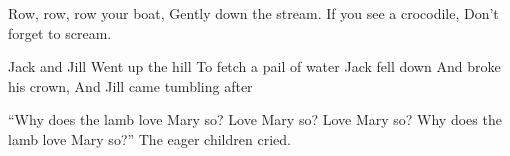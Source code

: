 \documentclass{article}
\begin{document}
\setlength{\columnseprule}{3pt} %
\begin{multicols}{3} %
Row, row, row your boat,
Gently down the stream.
If you see a crocodile,
Don't forget to scream.

\columnbreak
Jack and Jill
Went up the hill
To fetch a pail of water
Jack fell down
And broke his crown,
And Jill came tumbling after

\columnbreak
``Why does the lamb love Mary so?
Love Mary so? Love Mary so?
Why does the lamb love Mary so?''
The eager children cried.
\end{multicols}
\end{document}
